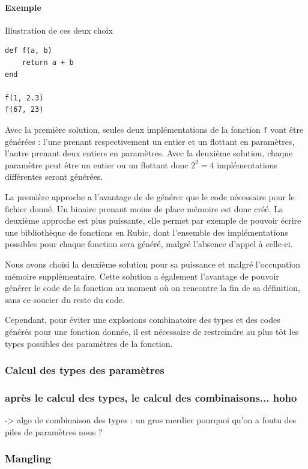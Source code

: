\documentclass[12pt]{article}
\begin{document}
\paragraph{Exemple} Illustration de ces deux choix
\begin{verbatim}
def f(a, b)
    return a + b
end 

f(1, 2.3)
f(67, 23)
\end{verbatim}

Avec la première solution, seules deux implémentations de la fonction \verb!f! vont être générées : l'une prenant respectivement un entier et un flottant en paramètres, l'autre prenant deux entiers en paramètres.
Avec la deuxième solution, chaque paramètre peut être un entier ou un flottant donc $2^{2} = 4$ implémentations différentes seront générées.

La première approche a l'avantage de de générer que le code nécessaire pour le fichier donné. Un binaire prenant moins de place mémoire est donc créé.
La deuxième approche est plus puissante, elle permet par exemple de pouvoir écrire une bibliothèque de fonctions en Rubic, dont l'ensemble des implémentations possibles pour chaque fonction sera généré, malgré l'absence d'appel à celle-ci.

Nous avons choisi la deuxième solution pour sa puissance et malgré l'occupation mémoire supplémentaire. Cette solution a également l'avantage de pouvoir générer le code de la fonction au moment où on rencontre la fin de sa définition, sans ce soucier du reste du code.

Cependant, pour éviter une explosions combinatoire des types et des codes générés pour une fonction donnée, il est nécessaire de restreindre au plus tôt les types possibles des paramètres de la fonction.

\subsubsection{Calcul des types des paramètres}

\subsubsection{après le calcul des types, le calcul des combinaisons... hoho}

-> algo de combinaison des types : un gros merdier
 pourquoi qu'on a foutu des piles de paramètres nous ?

\subsubsection{Mangling}
\end{document}
